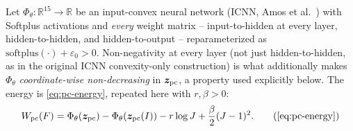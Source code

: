 \documentclass[10pt,a4paper]{article}
\newcommand{\R}{\mathbb{R}}
\begin{document}
Let $\Phi_\theta:\R^{15}\to\R$ be an input-convex neural network (ICNN,
Amos et al.~\cite{Amos2017}) with Softplus activations and \emph{every}
weight matrix -- input-to-hidden at every layer, hidden-to-hidden, and
hidden-to-output -- reparameterized as $\mathrm{softplus}(\cdot)+
\varepsilon_0>0$. Non-negativity at every layer (not just hidden-to-hidden,
as in the original ICNN convexity-only construction) is what additionally
makes $\Phi_\theta$ \emph{coordinate-wise non-decreasing} in $\bm
z_{\rm pc}$, a property used explicitly below. The energy is
\eqref{eq:pc-energy}, repeated here with $r,\beta>0$:
\begin{equation}
 W_{\rm pc}(F)=\Phi_\theta(\bm z_{\rm pc})-\Phi_\theta(\bm z_{\rm pc}(I))
 -r\log J+\frac\beta2(J-1)^2.
 \tag{\ref*{eq:pc-energy}}
\end{equation}
\end{document}
